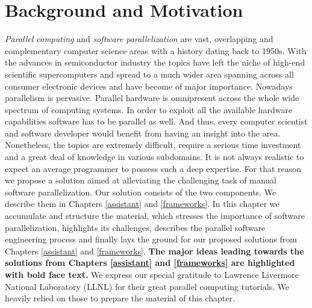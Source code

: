 \chapter{Background and Motivation}
\label{backgrnd}
\quad \textit{Parallel computing} and \textit{software parallelization} are vast, overlapping and complementary computer science areas with a history dating back to 1950s. With the advances in semiconductor industry the topics have left the niche of high-end scientific supercomputers and spread to a much wider area spanning across all consumer electronic devices and have become of major importance.\newline\null
\quad Nowadays parallelism is pervasive. Parallel hardware is omnipresent across the whole wide spectrum of computing systems. In order to exploit all the available hardware capabilities software has to be parallel as well. And thus, every computer scientist and software developer would benefit from having an insight into the area. Nonetheless, the topics are extremely difficult, require a serious time investment and a great deal of knowledge in various subdomains. It is not always realistic to expect an average programmer to possess such a deep expertise. For that reason we propose a solution aimed at alleviating the challenging task of manual software parallelization. Our solution consists of the two components. We describe them in Chapters \ref{assistant} and \ref{frameworks}.\newline\null
\quad In this chapter we accumulate and structure the material, which stresses the importance of software parallelization, highlights its challenges, describes the parallel software engineering process and finally lays the ground for our proposed solutions from Chapters \ref{assistant} and \ref{frameworks}. \textbf{The major ideas leading towards the solutions from Chapters \ref{assistant} and \ref{frameworks} are highlighted with bold face text.} We express our special gratitude to Lawrence Livermore National Laboratory (LLNL) \cite{llnl_computing} for their great parallel computing tutorials. We heavily relied on those to prepare the material of this chapter.\newline\null
%
